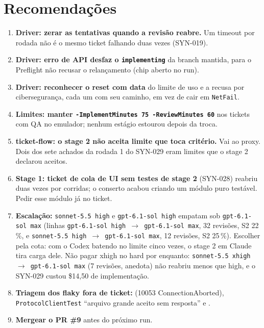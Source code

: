 \documentclass[11pt,a4paper]{article}
\begin{document}
\section{Recomendações}
\begin{enumerate}
  \item \textbf{Driver: zerar as tentativas quando a revisão reabre.} Um
        timeout por rodada não é o mesmo ticket falhando duas vezes (SYN-019).
  \item \textbf{Driver: erro de API desfaz o \texttt{implementing}} da branch
        mantida, para o Preflight não recusar o relançamento (chip aberto no
        run).
  \item \textbf{Driver: reconhecer o reset com data} do limite de uso e a recusa
        por cibersegurança, cada um com seu caminho, em vez de cair em
        \texttt{NetFail}.
  \item \textbf{Limites: manter \texttt{-ImplementMinutes 75
        -ReviewMinutes 60}} nos tickets com QA no emulador; nenhum estágio
        estourou depois da troca.
  \item \textbf{ticket-flow: o stage 2 não aceita limite que toca critério.}
        Vai ao proxy. Dois dos sete achados da rodada 1 do SYN-029 eram limites
        que o stage 2 declarou aceitos.
  \item \textbf{Stage 1: ticket de cola de UI sem testes de stage 2} (SYN-028)
        reabriu duas vezes por corridas; o conserto acabou criando um módulo
        puro testável. Pedir esse módulo já no ticket.
  \item \textbf{Escalação:} \texttt{sonnet-5.5 high} e \texttt{gpt-6.1-sol high} empatam sob
        \texttt{gpt-6.1-sol max} (linhas \texttt{gpt-6.1-sol high $\to$
        gpt-6.1-sol max}, 32 revisões, S2 22\,\%, e \texttt{sonnet-5.5 high
        $\to$ gpt-6.1-sol max}, 12 revisões, S2 25\,\%). Escolher pela cota:
        com o Codex batendo no limite cinco vezes, o stage 2 em Claude tira
        carga dele. Não pagar xhigh no hard por enquanto: \texttt{sonnet-5.5
        xhigh $\to$ gpt-6.1-sol max} (7 revisões, anedota) não reabriu menos
        que high, e o SYN-029 custou \$14,50 de implementação.
  \item \textbf{Triagem dos flaky fora de ticket:}
         (10053 ConnectionAborted),
        \texttt{ProtocolClientTest} ``arquivo grande aceito sem resposta'' e
        .
  \item \textbf{Mergear o PR \#9} antes do próximo run.
\end{enumerate}
\end{document}
